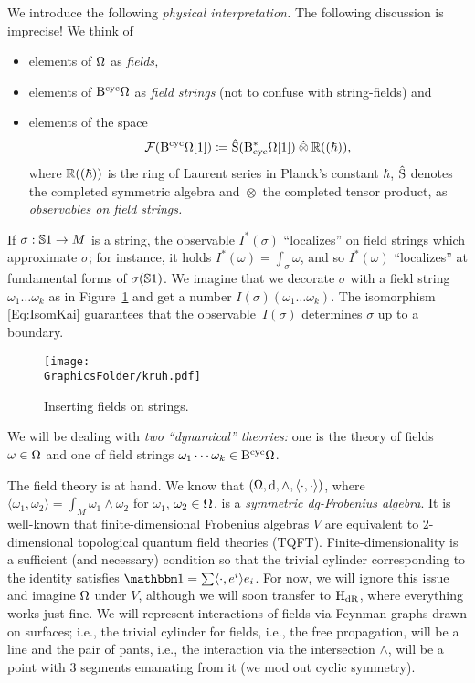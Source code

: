 \documentclass[\MainFolder/Text.tex]{subfiles}
\begin{document}
We introduce the following \emph{physical interpretation.} The following discussion is imprecise!
We think of
\begin{itemize}
\item elements of $\Omega$ as \emph{fields,}
\item elements of $\mathrm{B}^{\mathrm{cyc}} \Omega$ as \emph{field strings} (not to confuse with string-fields) and
\item elements of the space
$$ \Fun(\BCyc \DR[1]) \coloneqq \hat{\Sym}(\DBCyc\DR[1])\COtimes \R((\hbar)), $$
where $\mathbb{R}((\hbar))$ is the ring of Laurent series in Planck's constant $\hbar$, $\hat{\mathrm{S}}$ denotes the completed symmetric algebra and $\hat{\otimes}$ the completed tensor product, as \emph{observables on field strings.}
\end{itemize}
If $\sigma:\mathbb{S}{1}\rightarrow M$ is a string, the observable $I^*(\sigma)$ ``localizes'' on field strings which approximate $\sigma$; for instance, it holds $I^*(\omega) = \int_{\sigma} \omega$, and so $I^*(\omega)$ ``localizes'' at fundamental forms of $\sigma(\mathbb{S}{1})$. We imagine that we decorate $\sigma$ with a field string $\omega_1 \dotsc \omega_k$ as in Figure~\ref{Fig:GeomStr} and get a number $I(\sigma)(\omega_1\dotsc\omega_k)$. The isomorphism \eqref{Eq:IsomKai} guarantees that the observable~$I(\sigma)$ determines $\sigma$ up to a boundary.
\begin{figure}[t]
\centering
 \texttt{[image: \\GraphicsFolder/kruh.pdf]}
 \label{Fig:GeomStr}
 \caption{Inserting fields on strings.}
\end{figure}
We will be dealing with \emph{two ``dynamical'' theories:} one is the theory of fields $\omega\in \Omega$ and one of field strings $\omega_1 \dotsb \omega_k \in \mathrm{B}^{\mathrm{cyc}} \Omega$.

The field theory is at hand. We know that $(\Omega,\mathrm{d},\wedge,\langle\cdot,\cdot\rangle)$, where $\langle\omega_1,\omega_2\rangle = \int_M \omega_1 \wedge \omega_2$ for $\omega_1$, $\omega_2\in \Omega$, is a \emph{symmetric dg-Frobenius algebra}. It is well-known that finite-dimensional Frobenius algebras $V$ are equivalent to $2$-dimensional topological quantum field theories (TQFT). Finite-dimensionality is a sufficient (and necessary) condition so that the trivial cylinder corresponding to the identity satisfies $\Id = \sum \langle \cdot,e^i\rangle e_i$. For now, we will ignore this issue and imagine $\Omega$ under $V$, although we will soon transfer to $\mathrm{H}_{\mathrm{dR}}$, where everything works just fine.
We will represent interactions of fields via Feynman graphs drawn on surfaces; i.e., the trivial cylinder for fields, i.e., the free propagation, will be a line and the pair of pants, i.e., the interaction via the intersection $\wedge$, will be a point with $3$ segments emanating from it (we mod out cyclic symmetry).
\end{document}

